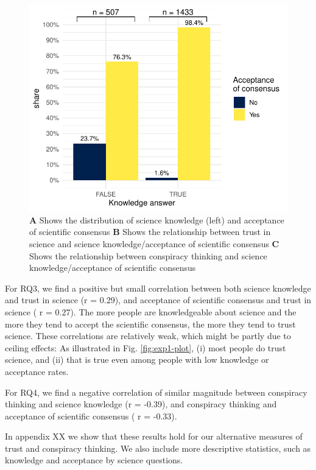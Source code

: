 \documentclass[
  doc,floatsintext]{apa6}
\begin{document}
\begin{figure}
\centering
\includegraphics{output/figures/exp1-conditional-acceptance.pdf}
\caption{\label{fig:exp1-conditional-acceptance}\textbf{A} Shows the distribution of science knowledge (left) and acceptance of scientific consensus \textbf{B} Shows the relationship between trust in science and science knowledge/acceptance of scientific consensus \textbf{C} Shows the relationship between conspiracy thinking and science knowledge/acceptance of scientific consensus}
\end{figure}

For RQ3, we find a positive but small correlation between both science knowledge and trust in science (r = 0.29), and acceptance of scientific consensus and trust in science ( r = 0.27). The more people are knowledgeable about science and the more they tend to accept the scientific consensus, the more they tend to trust science. These correlations are relatively weak, which might be partly due to ceiling effects: As illustrated in Fig. \ref{fig:exp1-plot}, (i) most people do trust science, and (ii) that is true even among people with low knowledge or acceptance rates.

For RQ4, we find a negative correlation of similar magnitude between conspiracy thinking and science knowledge (r = -0.39), and conspiracy thinking and acceptance of scientific consensus ( r = -0.33).

In appendix XX we show that these results hold for our alternative measures of trust and conspiracy thinking. We also include more descriptive statistics, such as knowledge and acceptance by science questions.
\end{document}

